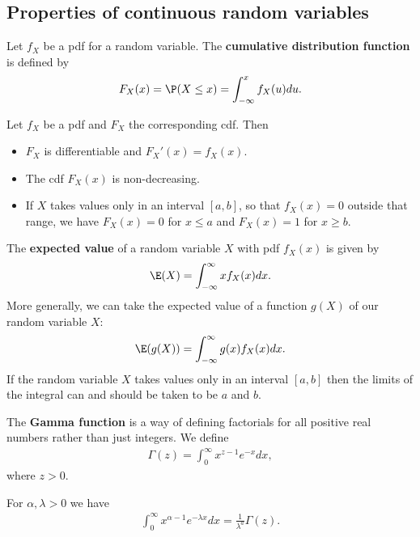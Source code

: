 \documentclass{article}
\begin{document}
\subsection{Properties of continuous random variables}
\begin{definition}
    Let $f_X$ be a pdf for a random variable. The \textbf{cumulative distribution
    function} is defined by
    \begin{align*}
        F_X(x) = \P(X\leq x) = \int_{-\infty}^x f_X(u)du.
    \end{align*}
\end{definition}
\begin{proposition}
    Let $f_X$ be a pdf and $F_X$ the corresponding cdf. Then
    \begin{itemize}
        \item $F_X$ is differentiable and $F_X'(x) = f_X(x)$.
        \item The cdf $F_X(x)$ is non-decreasing.
        \item If $X$ takes values only in an interval $[a,b]$, so that
              $f_X(x)=0$ outside that range, we have
              $F_X(x)=0$ for $x\leq a$ and $F_X(x)=1$ for $x\geq b$.
    \end{itemize}
\end{proposition}
\begin{definition}
    The \textbf{expected value} of a random variable $X$ with pdf $f_X(x)$ 
    is given by
    \begin{align*}
        \E(X) = \int_{-\infty}^\infty xf_X(x) dx.
    \end{align*}
    More generally, we can take the expected value of a function 
    $g(X)$ of our random variable $X$:
    \begin{align*}
        \E(g(X)) = \int_{-\infty}^\infty g(x) f_X(x)dx.
    \end{align*}
    If the random variable $X$ takes values only in an interval
    $[a,b]$ then the limits of the integral can and should be taken
    to be $a$ and $b$.
\end{definition}
\begin{definition}
    The \textbf{Gamma function} is a way of defining factorials for all
    positive real numbers rather than just integers. We define
    \begin{align*}
        \Gamma(z) = \int_0^\infty x^{z-1}e^{-x}dx,
    \end{align*}
    where $z>0$.
\end{definition}
\begin{theorem}
    For $\alpha,\lambda>0$ we have
    \begin{align*}
        \int_0^\infty x^{\alpha -1}e^{-\lambda x} dx = \frac{1}{\lambda^a}\Gamma(z).
    \end{align*}
\end{theorem}
\end{document}
